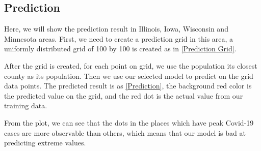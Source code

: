 \documentclass{article}
\begin{document}
\subsection{Prediction}
Here, we will show the prediction result in Illinois, Iowa, Wisconsin and Minnesota areas. First, we need to create a prediction grid in this area, a uniformly distributed grid of 100 by 100 is created as in \cref{Prediction Grid}.

After the grid is created, for each point on grid, we use the population its closest county as its population. Then we use our selected model to predict on the grid data points. The predicted result is as \cref{Prediction}, the background red color is the predicted value on the grid, and the red dot is the actual value from our training data. 

From the plot, we can see that the dots in the places which have peak Covid-19 cases are more observable than others, which means that our model is bad at predicting extreme values. 
\end{document}

